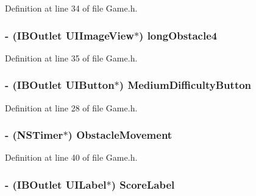 Definition at line 34 of file Game.\+h.

\hypertarget{interface_game_a2c33a254eedcc63d59745221cf2afbf4}{}
\subsubsection[{long\+Obstacle4}]{\setlength{\rightskip}{0pt plus 5cm}-\/ (I\+B\+Outlet U\+I\+Image\+View$\ast$) long\+Obstacle4\hspace{0.3cm}{\ttfamily [protected]}}\label{interface_game_a2c33a254eedcc63d59745221cf2afbf4}


Definition at line 35 of file Game.\+h.

\hypertarget{interface_game_a531920162f2cb866f3aa0af3ac5b292a}{}
\subsubsection[{Medium\+Difficulty\+Button}]{\setlength{\rightskip}{0pt plus 5cm}-\/ (I\+B\+Outlet U\+I\+Button$\ast$) Medium\+Difficulty\+Button\hspace{0.3cm}{\ttfamily [protected]}}\label{interface_game_a531920162f2cb866f3aa0af3ac5b292a}


Definition at line 28 of file Game.\+h.

\hypertarget{interface_game_a50db6bb0df163dfb0778bcf0336324fe}{}
\subsubsection[{Obstacle\+Movement}]{\setlength{\rightskip}{0pt plus 5cm}-\/ (N\+S\+Timer$\ast$) Obstacle\+Movement\hspace{0.3cm}{\ttfamily [protected]}}\label{interface_game_a50db6bb0df163dfb0778bcf0336324fe}


Definition at line 40 of file Game.\+h.

\hypertarget{interface_game_a59bd4bbbc65dae70048c54c2a88b38cc}{}
\subsubsection[{Score\+Label}]{\setlength{\rightskip}{0pt plus 5cm}-\/ (I\+B\+Outlet U\+I\+Label$\ast$) Score\+Label\hspace{0.3cm}{\ttfamily [protected]}}\label{interface_game_a59bd4bbbc65dae70048c54c2a88b38cc}


